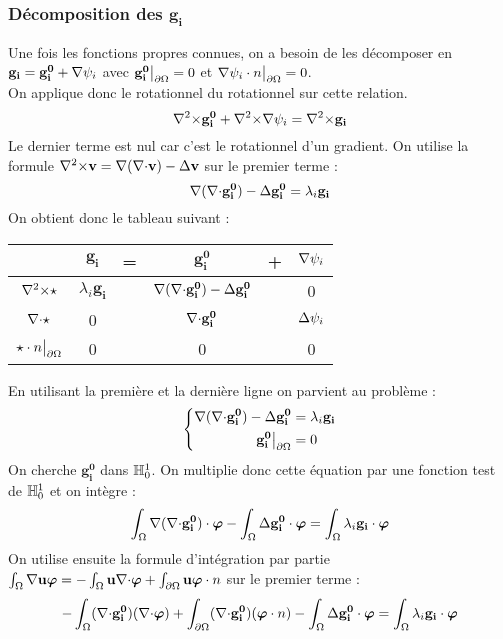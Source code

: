 \subsubsection{Décomposition des $\mathbf{g_i}$}
\label{decomp}

Une fois les fonctions propres connues, on a besoin de les décomposer en $\mathbf{g_i}=\mathbf{g_i^0}+{\nabla}\psi_i$ avec $\mathbf{g_i^0}{\big\rvert_{\partial\Omega}} = 0$ et ${\nabla}\psi_i\cdot n{\big\rvert_{\partial\Omega}} = 0$.\\
On applique donc le rotationnel du rotationnel sur cette relation.\\
\[
{\nabla^2\times} \mathbf{g_i^0} +{\nabla^2\times}{\nabla}\psi_i = {\nabla^2\times} \mathbf{g_i}
\]
Le dernier terme est nul car c'est le rotationnel d'un gradient. On utilise la formule ${\nabla^2\times} \mathbf{v}={\nabla}({\nabla\cdot} \mathbf{v})-{\Delta} \mathbf{v}$ sur le premier terme :
\[
{\nabla}({\nabla\cdot} \mathbf{g_i^0})-{\Delta} \mathbf{g_i^0} = \lambda_i \mathbf{g_i}
\]
On obtient donc le tableau suivant :
\begin{center}
\begin{tabular}{c|ccccc}
& $\mathbf{g_i}$ & = & $\mathbf{g_i^0}$ & + & ${\nabla}\psi_i$ \\ \hline
${\nabla^2\times}\star$ & $\lambda_i\mathbf{g_i}$ & & ${\nabla}({\nabla\cdot} \mathbf{g_i^0})-{\Delta} \mathbf{g_i^0}$ & & 0\\ \hline
${\nabla\cdot}\star$ & 0 & & ${\nabla\cdot} \mathbf{g_i^0}$ & & ${\Delta}\psi_i$\\ \hline
$\star\cdot n{\big\rvert_{\partial\Omega}}$ & 0 & & 0 & & 0
\end{tabular}
\end{center}
En utilisant la première et la dernière ligne on parvient au problème :
\begin{equation}
\label{gi0}
\left\{
\begin{aligned}
{\nabla}({\nabla\cdot} \mathbf{g_i^0})-{\Delta} \mathbf{g_i^0} &= \lambda_i\mathbf{g_i}\\
\mathbf{g_i^0}{\big\rvert_{\partial\Omega}} &= 0
\end{aligned}
\right.
\end{equation}
On cherche $\mathbf{g_i^0}$ dans ${\mathbb{H}}^1_0$. On multiplie donc cette équation par une fonction test de ${\mathbb{H}}^1_0$ et on intègre :
\[
\int_\Omega {\nabla}({\nabla\cdot} \mathbf{g_i^0})\cdot\bm{\varphi} - \int_\Omega {\Delta} \mathbf{g_i^0}\cdot\bm{\varphi} = \int_\Omega \lambda_i\mathbf{g_i}\cdot\bm{\varphi}
\]
On utilise ensuite la formule d'intégration par partie $\int_\Omega {\nabla}{\mathbf{u}}\bm{\varphi} = -\int_\Omega \mathbf{u}{\nabla\cdot}\bm{\varphi} + \int_{\partial\Omega} \mathbf{u}\bm{\varphi}\cdot n$ sur le premier terme :
\[
-\int_\Omega ({\nabla\cdot} \mathbf{g_i^0})({\nabla\cdot}\bm{\varphi}) + \int_{\partial\Omega} ({\nabla\cdot} \mathbf{g_i^0})(\bm{\varphi}\cdot n) - \int_\Omega {\Delta} \mathbf{g_i^0}\cdot\bm{\varphi} = \int_\Omega \lambda_i\mathbf{g_i}\cdot\bm{\varphi}
\]
